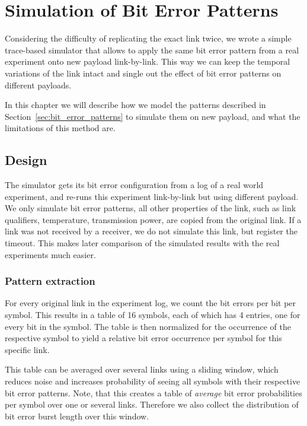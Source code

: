 \chapter{Simulation of Bit Error Patterns}

Considering the difficulty of replicating the exact link twice, we wrote a simple trace-based simulator that allows to apply the same bit error pattern from a real experiment onto new payload link-by-link.
This way we can keep the temporal variations of the link intact and single out the effect of bit error patterns on different payloads.

In this chapter we will describe how we model the patterns described in Section~\ref{sec:bit_error_patterns} to simulate them on new payload, and what the limitations of this method are.

\section{Design}

The simulator gets its bit error configuration from a log of a real world experiment, and re-runs this experiment link-by-link but using different payload.
We only simulate bit error patterns, all other properties of the link, such as link qualifiers, temperature, transmission power, are copied from the original link.
If a link was not received by a receiver, we do not simulate this link, but register the timeout.
This makes later comparison of the simulated results with the real experiments much easier.


\subsection{Pattern extraction}

For every original link in the experiment log, we count the bit errors per bit per symbol.
This results in a table of 16 symbols, each of which has 4 entries, one for every bit in the symbol.
The table is then normalized for the occurrence of the respective symbol to yield a relative bit error occurrence per symbol for this specific link.

This table can be averaged over several links using a sliding window, which reduces noise and increases probability of seeing all symbols with their respective bit error patterns.
Note, that this creates a table of \emph{average} bit error probabilities per symbol over one or several links.
Therefore we also collect the distribution of bit error burst length over this window.

